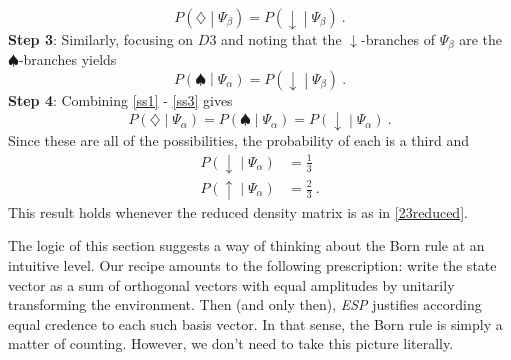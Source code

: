 \documentclass[12pt,onecolumn,secnumarabic,amsmath,amssymb,balancelastpage,nofootinbib]{article}
\begin{document}
\begin{equation}
P\left(\diamondsuit\middle|\Psi_\beta\right)=P\left(\downarrow\middle|\Psi_\beta\right)\ .
\label{ss2}
\end{equation}
\textbf{Step 3}:  Similarly, focusing on $D3$ and noting that the $\downarrow$-branches of $\Psi_\beta$ are the $\spadesuit$-branches yields
\begin{equation}
P\left(\spadesuit\middle|\Psi_\alpha\right)=P\left(\downarrow\middle|\Psi_\beta\right)\ .
\label{ss3}
\end{equation}
\textbf{Step 4}:  Combining \eqref{ss1} - \eqref{ss3} gives
\begin{equation}
P\left(\diamondsuit\middle|\Psi_\alpha\right)=P\left(\spadesuit\middle|\Psi_\alpha\right)=P\left(\downarrow\middle|\Psi_\alpha\right)\ .
\end{equation}
Since these are all of the possibilities, the probability of each is a third and 
\begin{align}
P\left(\downarrow\middle|\Psi_\alpha\right)&=\frac{1}{3}
\nonumber
\\
P\left(\uparrow\middle|\Psi_\alpha\right)&=\frac{2}{3}\ .
\end{align}
This result holds whenever the reduced density matrix is as in \eqref{23reduced}.

The logic of this section suggests a way of thinking about the Born rule at an intuitive level. Our recipe amounts to the following prescription: write the state vector as a sum of orthogonal vectors with equal amplitudes by unitarily transforming the environment. Then (and only then), \emph{ESP} justifies according equal credence to each such basis vector.  In that sense, the Born rule is simply a matter of counting.  However, we don't need to take this picture literally.
\end{document}
